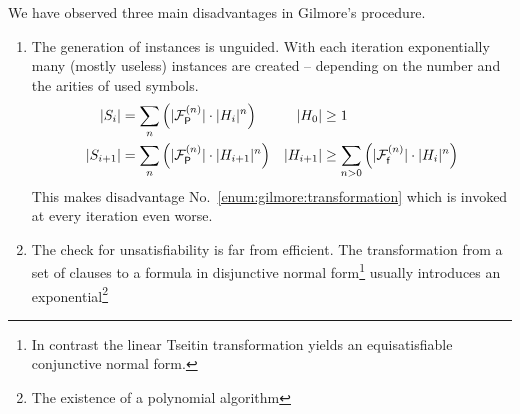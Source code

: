 We have observed three main disadvantages in Gilmore's procedure.
\begin{enumerate}
	\item\label{enum:gilmore:generation}
	The generation of instances is unguided. 
	With each iteration exponentially many (mostly useless)
	instances are created
	-- depending on the number and the arities of used symbols.
	\begin{align*}
	\lvert S_{i} \rvert &= \sum_n \left( \lvert {{\mathcal F}^{(n)}_{\mathsf P}} \rvert\cdot \lvert H_{i}\rvert^n \right)
	&
	\lvert H_0 \rvert &\geq 1	
	\\
	\lvert S_{i+1} \rvert &= \sum_n \left( \lvert {{\mathcal F}^{(n)}_{\mathsf P}} \rvert\cdot \lvert H_{i+1}\rvert^n \right)
	&
	\lvert H_{i+1}\rvert &\geq 
	\sum_{n>0}\left(
	\lvert{{\mathcal F}^{(n)}_{\mathsf f}}\rvert\cdot\lvert H_i \rvert^n
	\right) 
	\end{align*}
	This makes disadvantage No.~\ref{enum:gilmore:transformation} 
	which is invoked at every iteration even worse.
	\item\label{enum:gilmore:transformation} 
	The check for unsatisfiability is far from efficient.
	The transformation from a set of clauses 
	to a formula in disjunctive normal form\footnote{
		In contrast the linear Tseitin transformation yields an equisatisfiable conjunctive normal form.
	}
	usually introduces an exponential\footnote{
		The existence of a polynomial algorithm 
}
\end{enumerate}
